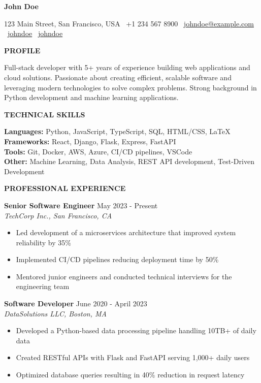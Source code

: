 \documentclass[11pt]{article}
\begin{document}
\begin{center}
    \textbf{\Large John Doe}\\ 
    \hrulefill
\end{center}
\begin{center}
	123 Main Street, San Francisco, USA \textbullet \ +1 234 567 8900 \textbullet \ \href{mailto:johndoe@example.com}{johndoe@example.com} \textbullet \ \href{https://www.linkedin.com/in/johndoe}{johndoe} \textbullet \ \href{https://github.com/johndoe}{johndoe}
\end{center}

\begin{center}
    \textbf{PROFILE}
\end{center}
Full-stack developer with 5+ years of experience building web applications and cloud solutions. Passionate about creating efficient, scalable software and leveraging modern technologies to solve complex problems. Strong background in Python development and machine learning applications.

\begin{center}
    \textbf{TECHNICAL SKILLS}
\end{center}
\textbf{Languages:} Python, JavaScript, TypeScript, SQL, HTML/CSS, LaTeX\\
\textbf{Frameworks:} React, Django, Flask, Express, FastAPI\\
\textbf{Tools:} Git, Docker, AWS, Azure, CI/CD pipelines, VSCode\\
\textbf{Other:} Machine Learning, Data Analysis, REST API development, Test-Driven Development

\begin{center}
    \textbf{PROFESSIONAL EXPERIENCE}
\end{center}
\textbf{Senior Software Engineer} \hfill May 2023 - Present\\
\textit{TechCorp Inc., San Francisco, CA}
\begin{itemize}[leftmargin=*, nosep]
    \item Led development of a microservices architecture that improved system reliability by 35\%
    \item Implemented CI/CD pipelines reducing deployment time by 50\%
    \item Mentored junior engineers and conducted technical interviews for the engineering team
\end{itemize}

\textbf{Software Developer} \hfill June 2020 - April 2023\\
\textit{DataSolutions LLC, Boston, MA}
\begin{itemize}[leftmargin=*, nosep]
    \item Developed a Python-based data processing pipeline handling 10TB+ of daily data
    \item Created RESTful APIs with Flask and FastAPI serving 1,000+ daily users
    \item Optimized database queries resulting in 40\% reduction in request latency
\end{itemize}
\end{document}
